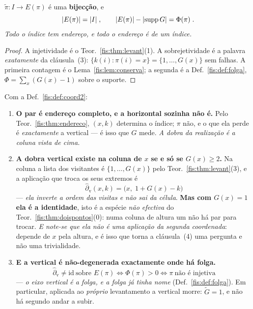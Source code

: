 \documentclass[livro.tex]{subfiles}
\begin{document}
\begin{teorema}\label{fis:thm:endereco}
$\tilde\pi\colon I\to E(\pi)$ é uma \textbf{bijecção}, e
\[
\lvert E(\pi)\rvert=\lvert I\rvert\;,\qquad
\lvert E(\pi)\rvert-\lvert \operatorname{supp}G\rvert=\Phi(\pi)\;.
\]
\emph{Todo o índice tem endereço, e todo o endereço é de um índice.}
\end{teorema}

\begin{proof}
A injetividade é o Teor.~\ref{fis:thm:levant}(1). A sobrejetividade é a palavra
\emph{exatamente} da cláusula~(3): $\{k(i):\pi(i)=x\}=\{1,\dots,G(x)\}$ sem
falhas. A primeira contagem é o Lema~\ref{fis:lem:conserva}; a segunda é a
Def.~\ref{fis:def:folga}, $\Phi=\sum_x(G(x)-1)$ sobre o suporte.
\end{proof}

\begin{teorema}\label{fis:thm:duascoord}
Com a Def.~\ref{fis:def:coord2}:
\begin{enumerate}\itemsep3pt
\item[(1)] \textbf{O par é endereço completo, e a horizontal sozinha não é.}
Pelo Teor.~\ref{fis:thm:endereco}, $(x,k)$ determina o índice; $\pi$ não, e o que
ela perde é \emph{exactamente} a vertical --- é isso que $G$ mede. \emph{A dobra
da realização é a coluna vista de cima.}
\item[(2)] \textbf{A dobra vertical existe na coluna de $x$ se e só se
$G(x)\ge2$.} Na coluna a lista dos visitantes é $\{1,\dots,G(x)\}$ pelo
Teor.~\ref{fis:thm:levant}(3), e a aplicação que troca os seus extremos é
\[
\boxed{\;\hat\partial_{\mathrm{v}}(x,k)=\bigl(x,\;1+G(x)-k\bigr)\;}
\]
--- \emph{ela inverte a ordem das visitas e não sai da célula}. \textbf{Mas com
$G(x)=1$ ela é a identidade}, isto é a espécie \emph{não efectiva} do
Teor.~\ref{fis:thm:doispontos}(0): numa coluna de
altura um não há par para trocar. \emph{E note-se que ela não é uma aplicação da
segunda coordenada}: depende de $x$ pela altura, e é isso que torna a
cláusula~(4) uma pergunta e não uma trivialidade.
\item[(3)] \textbf{E a vertical é não-degenerada exactamente onde há folga.}
\[
\boxed{\;\hat\partial_{\mathrm{v}}\neq\mathrm{id}\ \text{sobre }E(\pi)
\iff \Phi(\pi)>0 \iff \pi\ \text{não é injetiva}\;}
\]
--- \emph{o eixo vertical é a folga, e a folga já tinha nome}
(Def.~\ref{fis:def:folga}). Em particular, aplicada ao \emph{próprio}
levantamento a vertical morre: $\tilde G=1$, e não há segundo andar a subir.

\end{enumerate}
\end{teorema}
\end{document}
